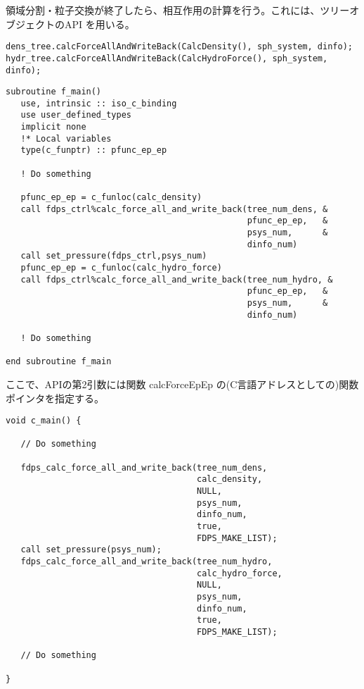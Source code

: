 領域分割・粒子交換が終了したら、相互作用の計算を行う。これには、ツリーオブジェクトのAPI \calcForceAllAndWriteBack を用いる。
\ifCpp %
\begin{lstlisting}[caption=相互作用計算の実行]
dens_tree.calcForceAllAndWriteBack(CalcDensity(), sph_system, dinfo);
hydr_tree.calcForceAllAndWriteBack(CalcHydroForce(), sph_system, dinfo);
\end{lstlisting}
\endifCpp
\ifFtn %
\begin{lstlisting}[caption=相互作用計算の実行]
subroutine f_main()
   use, intrinsic :: iso_c_binding
   use user_defined_types
   implicit none
   !* Local variables
   type(c_funptr) :: pfunc_ep_ep
   
   ! Do something
   
   pfunc_ep_ep = c_funloc(calc_density)
   call fdps_ctrl%calc_force_all_and_write_back(tree_num_dens, &
                                                pfunc_ep_ep,   &
                                                psys_num,      &
                                                dinfo_num)
   call set_pressure(fdps_ctrl,psys_num)
   pfunc_ep_ep = c_funloc(calc_hydro_force)
   call fdps_ctrl%calc_force_all_and_write_back(tree_num_hydro, &
                                                pfunc_ep_ep,   &
                                                psys_num,      &
                                                dinfo_num)

   ! Do something

end subroutine f_main
\end{lstlisting}
ここで、APIの第2引数には関数 calcForceEpEp の(C言語アドレスとしての)関数ポインタを指定する。
\endifFtn
\ifC %
\begin{lstlisting}[caption=相互作用計算の実行]
void c_main() {
   
   // Do something
   
   fdps_calc_force_all_and_write_back(tree_num_dens,
                                      calc_density,
                                      NULL,
                                      psys_num,
                                      dinfo_num,
                                      true,
                                      FDPS_MAKE_LIST);
   call set_pressure(psys_num);
   fdps_calc_force_all_and_write_back(tree_num_hydro,
                                      calc_hydro_force,
                                      NULL,
                                      psys_num,
                                      dinfo_num,
                                      true,
                                      FDPS_MAKE_LIST);

   // Do something

}
\end{lstlisting}
\endifC


